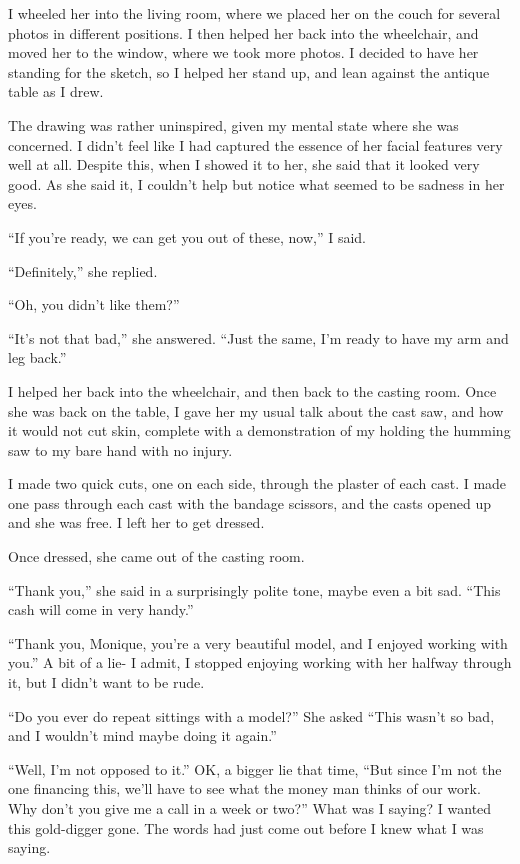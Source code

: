     I wheeled her into the living room, where we placed her on the couch for several photos in
different positions. I then helped her back into the wheelchair, and moved her to the window,
where we took more photos. I decided to have her standing for the sketch, so I helped her stand
up, and lean against the antique table as I drew.

    The drawing was rather uninspired, given my mental state where she was concerned. I didn't
feel like I had captured the essence of her facial features very well at all. Despite this, when
I showed it to her, she said that it looked very good. As she said it, I couldn't help but
notice what seemed to be sadness in her eyes.

    ``If you're ready, we can get you out of these, now,'' I said.

    ``Definitely,'' she replied.

    ``Oh, you didn't like them?''

    ``It's not that bad,'' she answered. ``Just the same, I'm ready to have my arm and leg
back.''

    I helped her back into the wheelchair, and then back to the casting room. Once she was back
on the table, I gave her my usual talk about the cast saw, and how it would not cut skin,
complete with a demonstration of my holding the humming saw to my bare hand with no injury.

    I made two quick cuts, one on each side, through the plaster of each cast. I made one pass
through each cast with the bandage scissors, and the casts opened up and she was free. I left
her to get dressed.

    Once dressed, she came out of the casting room.

    ``Thank you,'' she said in a surprisingly polite tone, maybe even a bit sad. ``This cash
will come in very handy.''

    ``Thank you, Monique, you're a very beautiful model, and I enjoyed working with you.'' A bit
of a lie- I admit, I stopped enjoying working with her halfway through it, but I didn't want to
be rude.

    ``Do you ever do repeat sittings with a model?'' She asked ``This wasn't so bad, and I
wouldn't mind maybe doing it again.''

    ``Well, I'm not opposed to it.'' OK, a bigger lie that time, ``But since I'm not the one
financing this, we'll have to see what the money man thinks of our work. Why don't you give me a
call in a week or two?'' What was I saying? I wanted this gold-digger gone. The words had just
come out before I knew what I was saying.

